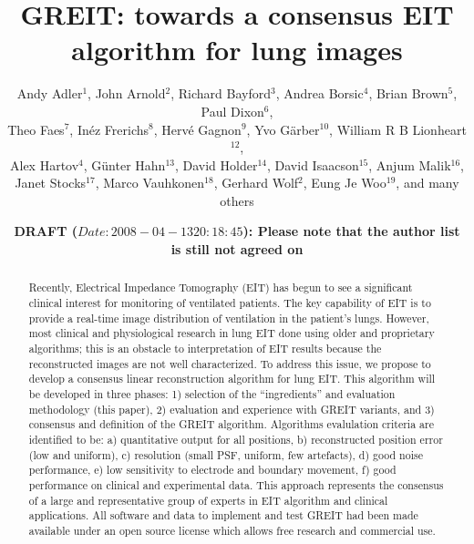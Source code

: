 \documentclass[letterpaper,twocolumn,11pt]{article}
\begin{document}
\title{\bf GREIT: towards a consensus EIT algorithm for lung images}

\author{Andy Adler$^{1}$,
        John Arnold$^{2}$,
        Richard Bayford$^{3}$,
        Andrea Borsic$^{4}$,
        Brian Brown$^{5}$,
        Paul Dixon$^{6}$,
\\
        Theo Faes$^{7}$,
        In\'ez Frerichs$^{8}$,
        Herv\'e Gagnon$^{9}$,
        Yvo G\"arber$^{10}$,
        William R B Lionheart$^{12}$,
\\
        Alex Hartov$^{4}$,
        G\"unter Hahn$^{13}$,
        David Holder$^{14}$,
        David Isaacson$^{15}$,
        Anjum Malik$^{16}$,
\\
        Janet Stocks$^{17}$,
        Marco Vauhkonen$^{18}$,
        Gerhard Wolf$^{2}$,
        Eung Je Woo$^{19}$,
        and many others%
       }

\date{\bf DRAFT ($Date: 2008-04-13 20:18:45 $): Please note that the
           author list is still not agreed on}
\maketitle



\begin{abstract}
Recently, Electrical Impedance Tomography (EIT) has begun to see a
significant clinical interest for monitoring of
ventilated patients.  The key capability of EIT is to
provide a real-time image distribution of ventilation in
the patient's lungs.
However, most clinical and physiological research in lung EIT
done using older and proprietary algorithms; this is
an obstacle to interpretation of EIT results because the
reconstructed images are not well characterized.
To address this issue, we propose to develop a 
consensus linear reconstruction algorithm for lung EIT.
This algorithm will be developed in three phases:
1) selection of the ``ingredients'' and evaluation 
methodology (this paper),
2) evaluation and experience with GREIT variants, and
3) consensus and definition of the GREIT algorithm.
Algorithms evalulation criteria are identified to be:
a) quantitative output for all positions,
b) reconstructed position error (low and uniform),
c) resolution (small PSF, uniform, few artefacts),
d) good noise performance,
e) low sensitivity to electrode and boundary movement,
f) good performance on clinical and experimental data.
This approach represents the consensus of a large and representative
group of experts in EIT algorithm and clinical applications.
All software and data to implement and test GREIT had been
made available under an open source license which allows free
research and commercial use.
\end{abstract}
\end{document}
